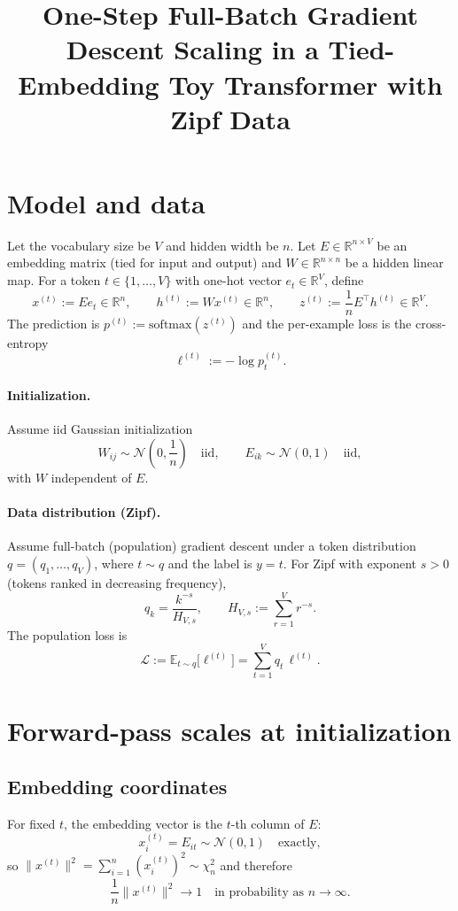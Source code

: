 \documentclass[11pt]{article}
\title{One-Step Full-Batch Gradient Descent Scaling in a Tied-Embedding Toy Transformer with Zipf Data}
\author{}
\date{}
\begin{document}
\maketitle

\section{Model and data}

Let the vocabulary size be $V$ and hidden width be $n$.
Let $E\in\mathbb{R}^{n\times V}$ be an embedding matrix (tied for input and output)
and $W\in\mathbb{R}^{n\times n}$ be a hidden linear map.
For a token $t\in\{1,\dots,V\}$ with one-hot vector $e_t\in\mathbb{R}^{V}$, define
\[
x^{(t)} := E e_t\in\mathbb{R}^n,\qquad
h^{(t)} := W x^{(t)}\in\mathbb{R}^n,\qquad
z^{(t)} := \frac{1}{n}E^\top h^{(t)}\in\mathbb{R}^V.
\]
The prediction is $p^{(t)} := \mathrm{softmax}(z^{(t)})$ and the per-example loss is the cross-entropy
\[
\ell^{(t)} := -\log p^{(t)}_t.
\]

\paragraph{Initialization.}
Assume iid Gaussian initialization
\[
W_{ij}\sim \mathcal{N}\!\left(0,\frac{1}{n}\right)\quad \text{iid},\qquad
E_{ik}\sim \mathcal{N}(0,1)\quad \text{iid},
\]
with $W$ independent of $E$.

\paragraph{Data distribution (Zipf).}
Assume full-batch (population) gradient descent under a token distribution
$q=(q_1,\dots,q_V)$, where $t\sim q$ and the label is $y=t$.
For Zipf with exponent $s>0$ (tokens ranked in decreasing frequency),
\[
q_k = \frac{k^{-s}}{H_{V,s}},\qquad H_{V,s}:=\sum_{r=1}^V r^{-s}.
\]
The population loss is
\[
\mathcal{L} := \mathbb{E}_{t\sim q}\big[\ell^{(t)}\big] = \sum_{t=1}^V q_t\,\ell^{(t)}.
\]

\section{Forward-pass scales at initialization}

\subsection{Embedding coordinates}
For fixed $t$, the embedding vector is the $t$-th column of $E$:
\[
x^{(t)}_i = E_{it}\sim \mathcal{N}(0,1)\quad \text{exactly},
\]
so $\|x^{(t)}\|^2=\sum_{i=1}^n (x^{(t)}_i)^2\sim \chi^2_n$ and therefore
\[
\frac{1}{n}\|x^{(t)}\|^2 \to 1 \quad \text{in probability as } n\to\infty.
\]
\end{document}

